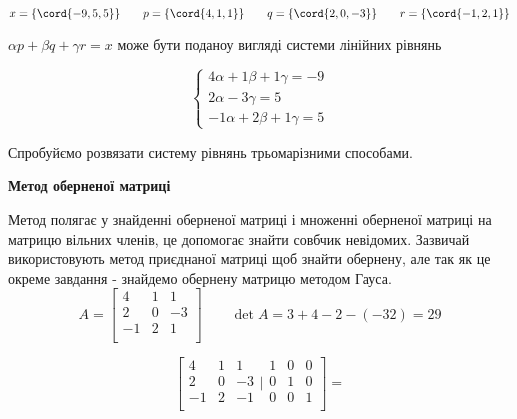 {}

$$
  x =\{\cord{-9,5,5}\} \qquad  p=\{\cord{4,1,1}\} \qquad q=\{\cord{2,0,-3}\}  \qquad r=\{\cord{-1,2,1}\}
$$

\begin{center}$ \alpha p+ \beta q+\gamma r=x$ може бути поданоу вигляді системи лінійних рівнянь\end{center}

$$
\begin{cases}
    4\alpha + 1\beta + 1\gamma = -9 \\
    2\alpha - 3\gamma = 5 \\
    -1\alpha + 2\beta + 1\gamma = 5
\end{cases}
$$

Спробуйємо розвязати систему рівнянь трьомарізними способами.


\begin{center}\textbf{ Метод оберненої матриці} \end{center}

  Метод полягає у знайденні оберненої матриці і множенні оберненої матриці на матрицю вільних членів, це допомогає знайти совбчик невідомих. Зазвичай використовують метод приєднаної матриці щоб знайти обернену, але так як це окреме завдання - знайдемо обернену матрицю методом Гауса.
%
$$
    A = \begin{bmatrix}
      4 & 1 &  1 \\
      2 & 0 & -3 \\
     -1 & 2 &  1 \\
    \end{bmatrix} \qquad \det{A} = 3 + 4 - 2 - (- 32) = 29
$$

$$
  \left[
  \begin{array}{rrr}
    4 & 1 &  1 \\
    2 & 0 & -3 \\
    -1 & 2 & -1 \\
  \end{array} \Bigg| \begin{array}{ccc}
    1 & 0 & 0 \\
    0 & 1 & 0 \\
    0 & 0 & 1 \\
  \end{array} \right] =
$$

